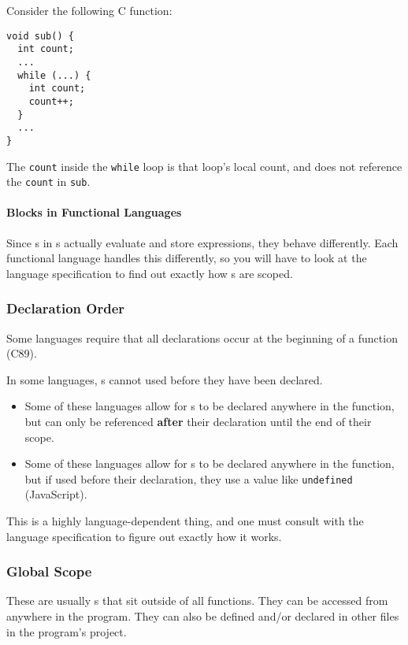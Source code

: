 Consider the following C function:
\begin{verbatim}
void sub() {
  int count;
  ...
  while (...) {
    int count;
    count++;
  }
  ...
}
\end{verbatim}
The \texttt{count} inside the \texttt{while} loop is that loop's local count, and does not reference the \texttt{count} in \texttt{sub}.

\paragraph{Blocks in Functional Languages}\label{par:Variable_Block_in_Functional_Languages}
Since s in s actually evaluate and store expressions, they behave differently.
Each functional language handles this differently, so you will have to look at the language specification to find out exactly how s are scoped.

\subsubsection{Declaration Order}\label{subsubsec:Variable_Declaration_Order}
Some languages require that all  declarations occur at the beginning of a function (C89).

In some languages, s cannot used before they have been declared.
\begin{itemize}[noitemsep]
\item Some of these languages allow for s to be declared anywhere in the function, but can only be referenced \textbf{after} their declaration until the end of their scope.
\item Some of these languages allow for s to be declared anywhere in the function, but if used before their declaration, they use a value like \texttt{undefined} (JavaScript).
\end{itemize}

This is a highly language-dependent thing, and one must consult with the language specification to figure out exactly how it works.

\subsubsection{Global Scope}\label{subsubsec:Variable_Global_Scope}
\begin{definition}\label{def:Global_Variable}
  These are usually s that sit outside of all functions.
  They can be accessed from anywhere in the program.
  They can also be defined and/or declared in other files in the program's project.
\end{definition}

